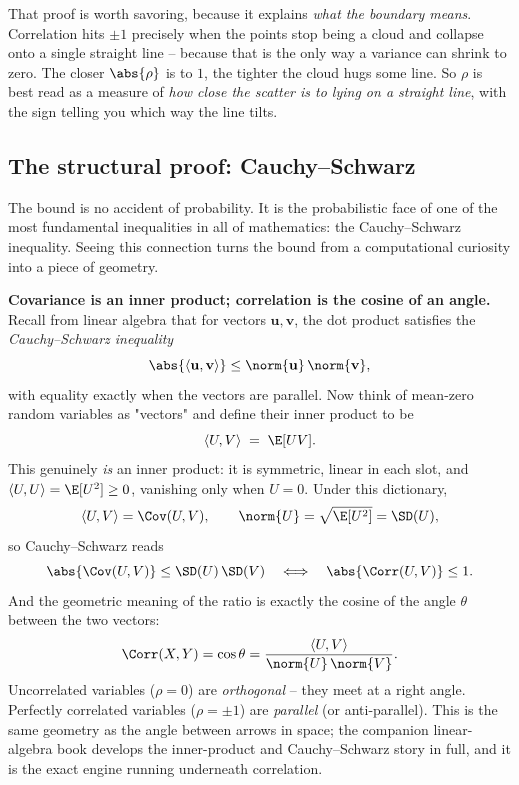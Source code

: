 \begin{happeningbox}
That proof is worth savoring, because it explains \emph{what the boundary means}.
Correlation hits $\pm 1$ precisely when the points stop being a cloud and collapse
onto a single straight line -- because that is the only way a variance can shrink to
zero. The closer $\abs{\rho}$ is to $1$, the tighter the cloud hugs some line. So
$\rho$ is best read as a measure of \emph{how close the scatter is to lying on a
straight line}, with the sign telling you which way the line tilts.
\end{happeningbox}

\subsection{The structural proof: Cauchy--Schwarz}

The bound is no accident of probability. It is the probabilistic face of one of the
most fundamental inequalities in all of mathematics: the Cauchy--Schwarz
inequality. Seeing this connection turns the bound from a computational curiosity
into a piece of geometry.

\begin{connectionbox}
\textbf{Covariance is an inner product; correlation is the cosine of an angle.}
Recall from linear algebra that for vectors $\mathbf{u}, \mathbf{v}$, the dot
product satisfies the \emph{Cauchy--Schwarz inequality}
\[
\abs{\langle \mathbf{u}, \mathbf{v}\rangle}
\le \norm{\mathbf{u}}\,\norm{\mathbf{v}},
\]
with equality exactly when the vectors are parallel. Now think of mean-zero random
variables as "vectors" and define their inner product to be
\[
\langle U, V \rangle \;=\; \E[UV].
\]
This genuinely \emph{is} an inner product: it is symmetric, linear in each slot, and
$\langle U, U\rangle = \E[U^2] \ge 0$, vanishing only when $U = 0$. Under this
dictionary,
\[
\langle U, V\rangle = \Cov(U, V), \qquad
\norm{U} = \sqrt{\E[U^2]} = \SD(U),
\]
so Cauchy--Schwarz reads
\[
\abs{\Cov(U, V)} \le \SD(U)\,\SD(V)
\quad\Longleftrightarrow\quad
\abs{\Corr(U, V)} \le 1.
\]
And the geometric meaning of the ratio is exactly the cosine of the angle $\theta$
between the two vectors:
\[
\Corr(X, Y) = \cos\theta = \frac{\langle U, V\rangle}{\norm{U}\,\norm{V}}.
\]
Uncorrelated variables ($\rho = 0$) are \emph{orthogonal} -- they meet at a right
angle. Perfectly correlated variables ($\rho = \pm 1$) are \emph{parallel} (or
anti-parallel). This is the same geometry as the angle between arrows in space; the
companion linear-algebra book develops the inner-product and Cauchy--Schwarz story
in full, and it is the exact engine running underneath correlation.
\end{connectionbox}

